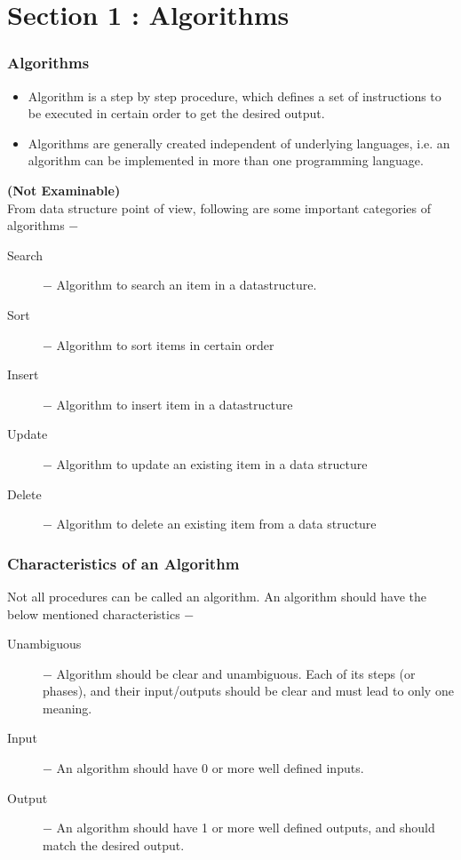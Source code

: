 \documentclass{beamer}
\begin{document}
\section{Section 1 : Algorithms}
\begin{frame}
	\frametitle{Algorithms}
	\large
	\begin{itemize}
		\item Algorithm is a step by step procedure, which defines a set of instructions to be executed in certain order to get the desired output.
		\item Algorithms are generally created independent of underlying languages, i.e. an algorithm can be implemented in more than one programming language.
		
	\end{itemize}
	
\end{frame}
\begin{frame}
\noindent \textbf{(Not Examinable)}\\
From data structure point of view, following are some important categories of algorithms −
	
	\begin{description}
		\item[Search] − Algorithm to search an item in a datastructure.
		\item[Sort] − Algorithm to sort items in certain order
		\item[Insert] − Algorithm to insert item in a datastructure
		\item[Update] − Algorithm to update an existing item in a data structure
		\item[Delete] − Algorithm to delete an existing item from a data structure
	\end{description}
	
\end{frame}
\begin{frame}
\frametitle{Characteristics of an Algorithm}
	Not all procedures can be called an algorithm. An algorithm should have the below mentioned characteristics −
	\begin{description}
		\item[Unambiguous] − Algorithm should be clear and unambiguous. Each of its steps (or phases), and their input/outputs should be clear and must lead to only one meaning.
		
		
		\item[Input] − An algorithm should have 0 or more well defined inputs.
		
		\item[Output] − An algorithm should have 1 or more well defined outputs, and should match the desired output.
	\end{description}
\end{frame}
\end{document}
